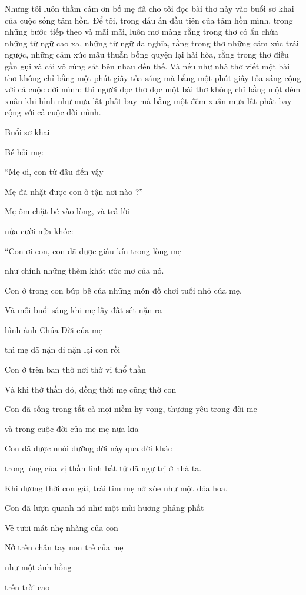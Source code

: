 Nhưng tôi luôn thầm cám ơn bố mẹ đã cho tôi đọc bài thơ này vào buổi sơ khai của cuộc sống tâm hồn. Để tôi, trong dấu ấn đầu tiên của tâm hồn mình, trong những bước tiếp theo và mãi mãi, luôn mơ màng rằng trong thơ có ẩn chứa những từ ngữ cao xa, những từ ngữ đa nghĩa, rằng trong thơ những cảm xúc trái ngược, những cảm xúc mâu thuẫn bỗng quyện lại hài hòa, rằng trong thơ điều gần gụi và cái vô cùng sát bên nhau đến thế. Và nếu như nhà thơ viết một bài thơ không chỉ bằng một phút giây tỏa sáng mà bằng một phút giây tỏa sáng cộng với cả cuộc đời mình; thì người đọc thơ đọc một bài thơ không chỉ bằng một đêm xuân khi hình như mưa lất phất bay mà bằng một đêm xuân mưa lất phất bay cộng với cả cuộc đời mình.

Buổi sơ khai

Bé hỏi mẹ:

“Mẹ ơi, con từ đâu đến vậy

Mẹ đã nhặt được con ở tận nơi nào ?”

Mẹ ôm chặt bé vào lòng, và trả lời

nửa cười nửa khóc:

“Con ơi con, con đã được giấu kín trong lòng mẹ

như chính những thèm khát ước mơ của nó.

Con ở trong con búp bê của những món đồ chơi tuổi nhỏ của mẹ.

Và mỗi buổi sáng khi mẹ lấy đất sét nặn ra

hình ảnh Chúa Đời của mẹ

thì mẹ đã nặn đi nặn lại con rồi

Con ở trên ban thờ nơi thờ vị thổ thần

Và khi thờ thần đó, đồng thời mẹ cũng thờ con

Con đã sống trong tất cả mọi niềm hy vọng, thương yêu trong đời mẹ

và trong cuộc đời của mẹ mẹ nữa kia

Con đã được nuôi dưỡng đời này qua đời khác

trong lòng của vị thần linh bất tử đã ngự trị ở nhà ta.

Khi đương thời con gái, trái tim mẹ nở xòe như một đóa hoa.

Con đã lượn quanh nó như một mùi hương phảng phất

Vẻ tươi mát nhẹ nhàng của con

Nở trên chân tay non trẻ của mẹ

như một ánh hồng

trên trời cao

